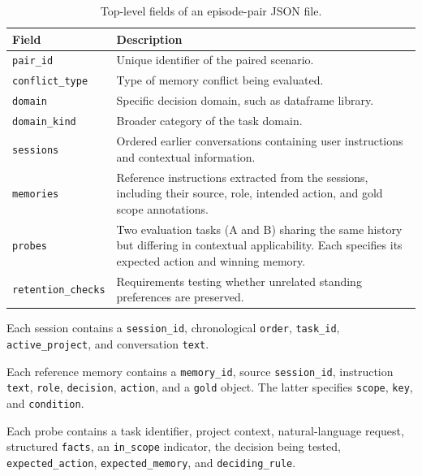 \documentclass[11pt,a4paper]{article}
\begin{document}
\begin{table}[htbp]
\centering
\small
\caption{Top-level fields of an episode-pair JSON file.}
\label{tab:episode-schema}
\begin{tabularx}{\linewidth}{lX}
\toprule
Field & Description \\
\midrule
\texttt{pair\_id} &
Unique identifier of the paired scenario. \\

\texttt{conflict\_type} &
Type of memory conflict being evaluated. \\

\texttt{domain} &
Specific decision domain, such as dataframe library. \\

\texttt{domain\_kind} &
Broader category of the task domain. \\

\texttt{sessions} &
Ordered earlier conversations containing user
instructions and contextual information. \\

\texttt{memories} &
Reference instructions extracted from the sessions,
including their source, role, intended action,
and gold scope annotations. \\

\texttt{probes} &
Two evaluation tasks (A and B) sharing the same
history but differing in contextual applicability.
Each specifies its expected action and winning memory. \\

\texttt{retention\_checks} &
Requirements testing whether unrelated standing
preferences are preserved. \\
\bottomrule
\end{tabularx}
\end{table}

Each session contains a \texttt{session\_id},
chronological \texttt{order}, \texttt{task\_id},
\texttt{active\_project}, and conversation
\texttt{text}.

Each reference memory contains a \texttt{memory\_id},
source \texttt{session\_id}, instruction \texttt{text},
\texttt{role}, \texttt{decision}, \texttt{action},
and a \texttt{gold} object. The latter specifies
\texttt{scope}, \texttt{key}, and \texttt{condition}.

Each probe contains a task identifier, project context,
natural-language request, structured \texttt{facts},
an \texttt{in\_scope} indicator, the decision being
tested, \texttt{expected\_action},
\texttt{expected\_memory}, and \texttt{deciding\_rule}.
\end{document}
